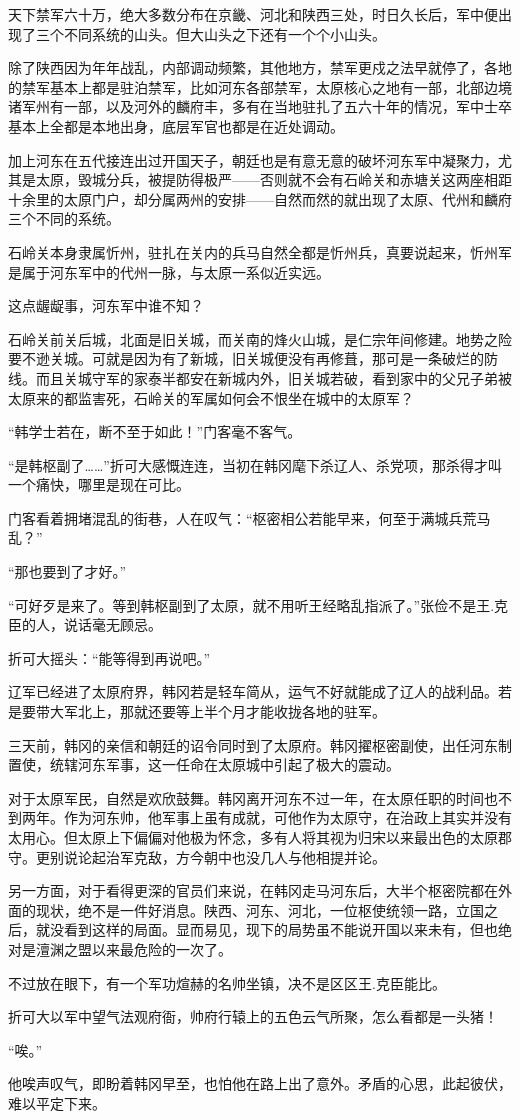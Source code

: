 天下禁军六十万，绝大多数分布在京畿、河北和陕西三处，时日久长后，军中便出现了三个不同系统的山头。但大山头之下还有一个个小山头。

除了陕西因为年年战乱，内部调动频繁，其他地方，禁军更戍之法早就停了，各地的禁军基本上都是驻泊禁军，比如河东各部禁军，太原核心之地有一部，北部边境诸军州有一部，以及河外的麟府丰，多有在当地驻扎了五六十年的情况，军中士卒基本上全都是本地出身，底层军官也都是在近处调动。

加上河东在五代接连出过开国天子，朝廷也是有意无意的破坏河东军中凝聚力，尤其是太原，毁城分兵，被提防得极严——否则就不会有石岭关和赤塘关这两座相距十余里的太原门户，却分属两州的安排——自然而然的就出现了太原、代州和麟府三个不同的系统。

石岭关本身隶属忻州，驻扎在关内的兵马自然全都是忻州兵，真要说起来，忻州军是属于河东军中的代州一脉，与太原一系似近实远。

这点龌龊事，河东军中谁不知？

石岭关前关后城，北面是旧关城，而关南的烽火山城，是仁宗年间修建。地势之险要不逊关城。可就是因为有了新城，旧关城便没有再修葺，那可是一条破烂的防线。而且关城守军的家泰半都安在新城内外，旧关城若破，看到家中的父兄子弟被太原来的都监害死，石岭关的军属如何会不恨坐在城中的太原军？

“韩学士若在，断不至于如此！”门客毫不客气。

“是韩枢副了……”折可大感慨连连，当初在韩冈麾下杀辽人、杀党项，那杀得才叫一个痛快，哪里是现在可比。

门客看着拥堵混乱的街巷，人在叹气：“枢密相公若能早来，何至于满城兵荒马乱？”

“那也要到了才好。”

“可好歹是来了。等到韩枢副到了太原，就不用听王经略乱指派了。”张俭不是王.克臣的人，说话毫无顾忌。

折可大摇头：“能等得到再说吧。”

辽军已经进了太原府界，韩冈若是轻车简从，运气不好就能成了辽人的战利品。若是要带大军北上，那就还要等上半个月才能收拢各地的驻军。

三天前，韩冈的亲信和朝廷的诏令同时到了太原府。韩冈擢枢密副使，出任河东制置使，统辖河东军事，这一任命在太原城中引起了极大的震动。

对于太原军民，自然是欢欣鼓舞。韩冈离开河东不过一年，在太原任职的时间也不到两年。作为河东帅，他军事上虽有成就，可他作为太原守，在治政上其实并没有太用心。但太原上下偏偏对他极为怀念，多有人将其视为归宋以来最出色的太原郡守。更别说论起治军克敌，方今朝中也没几人与他相提并论。

另一方面，对于看得更深的官员们来说，在韩冈走马河东后，大半个枢密院都在外面的现状，绝不是一件好消息。陕西、河东、河北，一位枢使统领一路，立国之后，就没看到这样的局面。显而易见，现下的局势虽不能说开国以来未有，但也绝对是澶渊之盟以来最危险的一次了。

不过放在眼下，有一个军功煊赫的名帅坐镇，决不是区区王.克臣能比。

折可大以军中望气法观府衙，帅府行辕上的五色云气所聚，怎么看都是一头猪！

“唉。”

他唉声叹气，即盼着韩冈早至，也怕他在路上出了意外。矛盾的心思，此起彼伏，难以平定下来。
